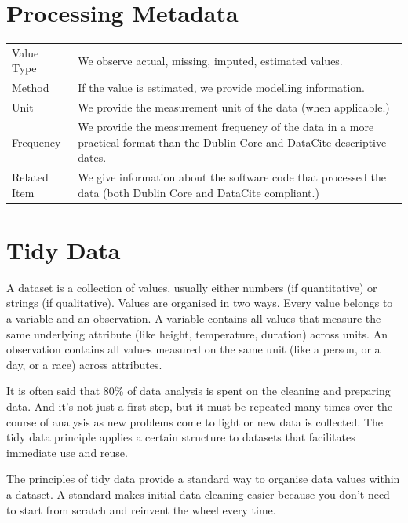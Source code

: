 \documentclass[
  a4paper,
  openany, a4paper, oneside]{book}
\begin{document}
\hypertarget{processing-metadata}{%
\section{Processing Metadata}\label{processing-metadata}}

\begin{longtable}[]{@{}
  >{\raggedright\arraybackslash}p{}
  >{\centering\arraybackslash}p{}@{}}
\toprule
& \\
\midrule
\endhead
Value Type & We observe actual, missing, imputed, estimated values. \\
Method & If the value is estimated, we provide modelling information. \\
Unit & We provide the measurement unit of the data (when applicable.) \\
Frequency & We provide the measurement frequency of the data in a more practical format than the Dublin Core and DataCite descriptive dates. \\
Related Item & We give information about the software code that processed the data (both Dublin Core and DataCite compliant.) \\
\bottomrule
\end{longtable}

\hypertarget{tidy-data}{%
\section{Tidy Data}\label{tidy-data}}

A dataset is a collection of values, usually either numbers (if quantitative) or strings (if qualitative). Values are organised in two ways. Every value belongs to a variable and an observation. A variable contains all values that measure the same underlying attribute (like height, temperature, duration) across units. An observation contains all values measured on the same unit (like a person, or a day, or a race) across attributes.

It is often said that 80\% of data analysis is spent on the cleaning and preparing data. And it's not just a first step, but it must be repeated many times over the course of analysis as new problems come to light or new data is collected. The tidy data principle applies a certain structure to datasets that facilitates immediate use and reuse.

The principles of tidy data provide a standard way to organise data values within a dataset. A standard makes initial data cleaning easier because you don't need to start from scratch and reinvent the wheel every time.
\end{document}
